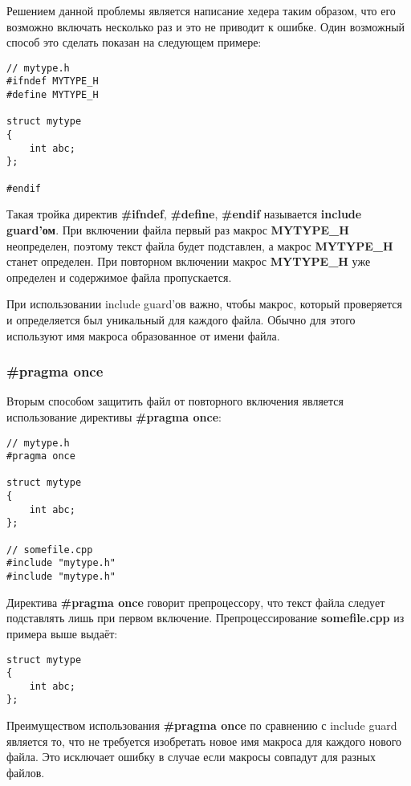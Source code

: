 Решением данной проблемы является написание хедера таким образом, что его возможно включать несколько раз и это не приводит к ошибке. Один возможный способ это сделать показан на следующем примере:

\begin{verbatim}
// mytype.h
#ifndef MYTYPE_H
#define MYTYPE_H

struct mytype
{
    int abc;
};

#endif
\end{verbatim}

Такая тройка директив {\bf \#ifndef}, {\bf \#define}, {\bf \#endif} называется {\bf include guard'ом}. При включении файла первый раз макрос {\bf MYTYPE\_H} неопределен, поэтому текст файла будет подставлен, а макрос {\bf MYTYPE\_H} станет определен. При повторном включении макрос {\bf MYTYPE\_H} уже определен и содержимое файла пропускается.

При использовании include guard'ов важно, чтобы макрос, который проверяется и определяется был уникальный для каждого файла. Обычно для этого используют имя макроса образованное от имени файла.

\subsubsection{\#pragma once}
\label{pragma_once}
Вторым способом защитить файл от повторного включения является использование директивы {\bf \#pragma once}:

\begin{verbatim}
// mytype.h
#pragma once

struct mytype
{
    int abc;
};

// somefile.cpp
#include "mytype.h"
#include "mytype.h"
\end{verbatim}

Директива {\bf \#pragma once} говорит препроцессору, что текст файла следует подставлять лишь при первом включение. Препроцессирование {\bf somefile.cpp} из примера выше выдаёт:

\begin{verbatim}
struct mytype
{
    int abc;
};
\end{verbatim}

Преимуществом использования {\bf \#pragma once} по сравнению с include guard является то, что не требуется изобретать новое имя макроса для каждого нового файла. Это исключает ошибку в случае если макросы совпадут для разных файлов.

